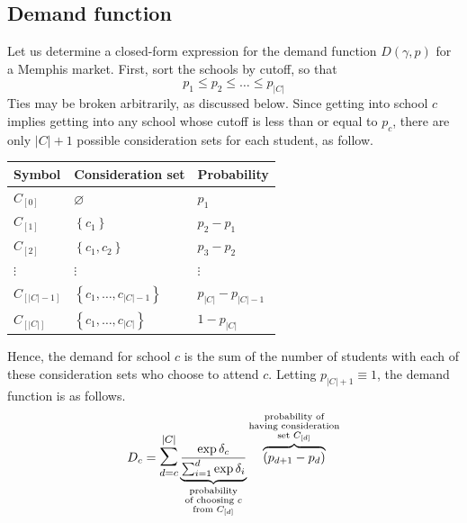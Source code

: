 \documentclass[12pt]{article}
\numberwithin{equation}{subsection}
\theoremstyle{definition}
\begin{document}
\subsection{Demand function}
Let us determine a closed-form expression for the demand function $D(\gamma, p)$ for a Memphis market. First, sort the schools by cutoff, so that
\[p_1 \leq p_2 \leq \dots \leq p_{|C|}\]
Ties may be broken arbitrarily, as discussed below. Since getting into school $c$ implies getting into any school whose cutoff is less than or equal to $p_c$, there are only $|C| + 1$ possible consideration sets for each student, as follow.
\begin{center}
\begin{tabular}{lll}
\textbf{Symbol} & \textbf{Consideration set} & \textbf{Probability} \\ \hline
$C_{[0]}$    & $\varnothing$    & $p_1$                  \\
$C_{[1]}$    & $\left\{ c_1 \right\}$    & $p_2 - p_1$               \\
$C_{[2]}$    & $\left\{ c_1, c_2 \right\}$    & $p_3 - p_2$               \\
$\vdots$ & $\vdots$ & $\vdots$ \\
$C_{[|C| - 1]}$           & $\left\{ c_1, \dots, c_{|C| - 1} \right\}$     & $p_{|C|} - p_{|C|-1}$             \\
$C_{[|C|]}$           & $\left\{ c_1, \dots, c_{|C|} \right\}$     & $1 - p_{|C|}$                 
\end{tabular}
\end{center}
Hence, the demand for school $c$ is the sum of the number of students with each of these consideration sets who choose to attend $c$. Letting $p_{|C|+1} \equiv 1$, the demand function is as follows.
\begin{equation}D_c = \mathlarger{\mathlarger{\sum}}_{d=c}^{|C|} 
\underbrace{\frac{\exp{\delta_c}}{ \sum_{i=1}^d \exp{\delta_i}}}_{\substack{\text{probability} \\ \text{of choosing } c \\ \text{from }C_{[d]}}} 
\overbrace{\left(p_{d+1} - p_{d}\right)}^{\substack{\text{probability of}\\ \text{having consideration} \\ \text{set }C_{[d]}}} 
\label{mnlonetestdemand}\end{equation}
\end{document}
